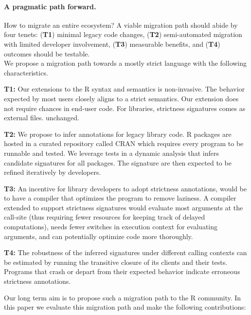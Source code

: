 \documentclass[review,nonacm,screen,acmsmall,anonymous=true]{acmart}
\begin{document}
\paragraph{A pragmatic path forward.} How to  migrate an entire ecosystem?
A viable migration path should abide by four tenets: ({\bf T1}) minimal legacy
code changes, ({\bf T2}) semi-automated migration with limited developer
involvement, ({\bf T3}) measurable benefits, and ({\bf T4}) outcomes should be
testable.\\ We propose a migration path towards a mostly strict language
with the following characteristics.
\vspace{1mm}
\begin{compactitem}[---]
\item {\bf T1:} Our extensions to the R syntax and semantics is non-invasive.
  The behavior expected by most users closely aligns to a strict semantics. Our
  extension does not require chances in end-user code. For libraries, strictness
  signatures comes as external files.
  unchanged.
\item {\bf T2:} We propose to infer annotations for legacy library code. R
  packages are hosted in a curated repository called CRAN which requires every
  program to be runnable and tested. We leverage tests in a dynamic analysis
  that infers candidate signatures for all packages. The signature are then
  expected to be refined iteratively by developers.
\item {\bf T3:} An incentive for library developers to adopt strictness
  annotations, would be to have a compiler that optimizes the program to remove
  laziness. A compiler extended to support strictness signatures would evaluate
  most arguments at the call-site (thus requiring fewer resources for keeping
  track of delayed computations), needs fewer switches in execution context for
  evaluating arguments, and can potentially optimize code more thoroughly.
\item {\bf T4:} The robustness of the inferred signatures under different
  calling contexts can be estimated by running the transitive closure
  of its clients and their tests. Programs that crash or depart from their
  expected behavior indicate erroneous strictness annotations.
\end{compactitem}

\medskip
\noindent Our long term aim is to propose such a migration path to the R community. In
this paper we evaluate this migration path and make the following contributions:
\vspace{1mm}
\end{document}
